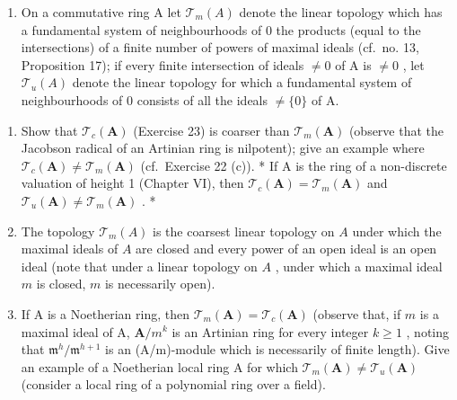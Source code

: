 \begin{enumerate}
\def\labelenumi{\arabic{enumi}.}
\setcounter{enumi}{23}
\tightlist
\item
  On a commutative ring A let \(\mathcal{T}_{m}(A)\) denote the linear topology which has a fundamental system of neighbourhoods of 0 the products (equal to the intersections) of a finite number of powers of maximal ideals (cf.~no. 13, Proposition 17); if every finite intersection of ideals \(\neq0\) of A is \(\neq0\) , let \(\mathcal{T}_{u}(A)\) denote the linear topology for which a fundamental system of neighbourhoods of 0 consists of all the ideals \(\neq\{0\}\) of A.
\end{enumerate}

\begin{enumerate}
\def\labelenumi{(\alph{enumi})}
\item
  Show that \(\mathcal{T}_c(\mathbf{A})\) (Exercise 23) is coarser than \(\mathcal{T}_m(\mathbf{A})\) (observe that the Jacobson radical of an Artinian ring is nilpotent); give an example where \(\mathcal{T}_c(\mathbf{A}) \neq \mathcal{T}_m(\mathbf{A})\) (cf.~Exercise 22 (c)). * If A is the ring of a non-discrete valuation of height 1 (Chapter VI), then \(\mathcal{T}_c(\mathbf{A}) = \mathcal{T}_m(\mathbf{A})\) and \(\mathcal{T}_u(\mathbf{A}) \neq \mathcal{T}_m(\mathbf{A})\) . *
\item
  The topology \(\mathcal{T}_m(A)\) is the coarsest linear topology on \(A\) under which the maximal ideals of \(A\) are closed and every power of an open ideal is an open ideal (note that under a linear topology on \(A\) , under which a maximal ideal \(m\) is closed, \(m\) is necessarily open).
\item
  If A is a Noetherian ring, then \(\mathcal{T}_{m}(\mathbf{A}) = \mathcal{T}_{c}(\mathbf{A})\) (observe that, if \(m\) is a maximal ideal of A, \(\mathbf{A} / m^{k}\) is an Artinian ring for every integer \(k \geqslant 1\) , noting that \(\mathfrak{m}^h / \mathfrak{m}^{h+1}\) is an (A/m)-module which is necessarily of finite length). Give an example of a Noetherian local ring A for which \(\mathcal{T}_{m}(\mathbf{A}) \neq \mathcal{T}_{u}(\mathbf{A})\) (consider a local ring of a polynomial ring over a field).
\end{enumerate}

